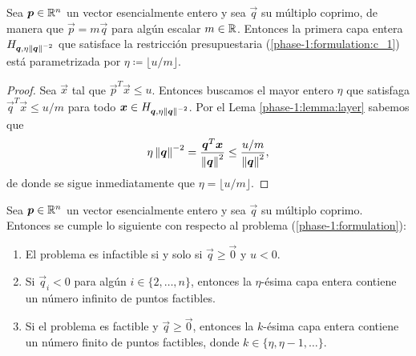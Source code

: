 \begin{lemma}
	\label{phase-1:lemma:eta}
	Sea $\boldsymbol{p} \in \mathbb{R}^n$ un vector esencialmente entero y sea $\vec{q}$ su múltiplo coprimo, de
	manera que $\vec{p} = m\vec{q}$ para algún escalar $m \in \mathbb{R}$. Entonces la primera capa entera
	$H_{\boldsymbol{q}, \eta \left\lVert \boldsymbol{q} \right\rVert^{-2}}$ que satisface la restricción presupuestaria
	(\ref{phase-1:formulation:c_1}) está parametrizada por $\eta \coloneq \lfloor u/m \rfloor$.
\end{lemma}
\begin{proof}
	Sea $\vec{x}$ tal que $\vec{p}^T\vec{x} \leq u$. Entonces buscamos el mayor entero $\eta$ que
	satisfaga $\vec{q}^T\vec{x} \leq u/m$ para todo $\boldsymbol{x} \in H_{\boldsymbol{q},
	\eta\left\lVert \boldsymbol{q} \right\rVert^{-2}}$. Por el Lema \ref{phase-1:lemma:layer} sabemos que
	\begin{equation*}
		\eta\left\lVert \boldsymbol{q} \right\rVert^{-2} = \frac{\boldsymbol{q}^T\boldsymbol{x}}{\left\lVert \boldsymbol{q} \right\rVert^2} \leq
		\frac{u/m}{\left\lVert \boldsymbol{q} \right\rVert^2},
	\end{equation*}
	de donde se sigue inmediatamente que $\eta = \lfloor u/m \rfloor$.
\end{proof}
\begin{theorem}
	\label{phase-1:th:feasibility}
	Sea $\boldsymbol{p} \in \mathbb{R}^n$ un vector esencialmente entero y sea $\vec{q}$ su múltiplo coprimo.
	Entonces se cumple lo siguiente con respecto al problema (\ref{phase-1:formulation}):
	\begin{enumerate}
		\item El problema es infactible si y solo si $\vec{q} \geq \vec{0}$ y $u < 0$.
		\item Si $\vec{q}_i < 0$ para algún $i \in \lbrace 2, \ldots, n
			\rbrace$, entonces la $\eta$-ésima capa entera contiene un número infinito de puntos
			factibles.
		\item Si el problema es factible y $\vec{q} \geq \vec{0}$, entonces la $k$-ésima capa entera
			contiene un número finito de puntos factibles, donde $k \in \lbrace \eta, \eta - 1,
			\ldots \rbrace$.
	\end{enumerate}
\end{theorem}
